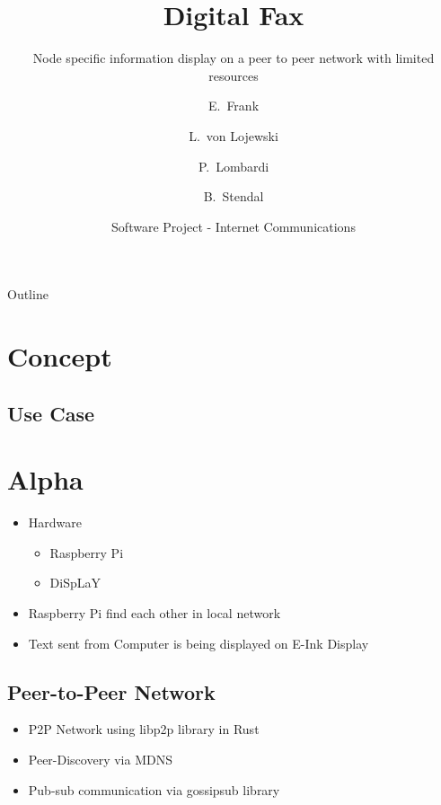 \documentclass[ucs,9pt]{beamer}
\title[Digital Fax] %
{Digital Fax}
\subtitle
{Node specific information display on a peer to peer network with limited resources  }
\author[Frank, Lojewski, Lombardi, Stendal] %
{E.~Frank \and L.~von Lojewski \and P.~Lombardi \and B.~Stendal}
\institute[FU Berlin]
{Freie Universität Berlin}
\date[SWP Internet Communication] 
{Software Project - Internet Communications}
\begin{document}
\begin{frame}[plain]
  \titlepage
\end{frame}

\begin{frame}{Outline}
  \tableofcontents
\end{frame}

\section{Concept}
\begin{frame}{\insertsection}

\end{frame}
\subsection{Use Case}
\begin{frame}{\insertsubsection}
\end{frame}

\section{Alpha}
\begin{frame}{\insertsection}
\begin{itemize}
    \item Hardware
    \begin{itemize}
        \item Raspberry Pi 
        \item DiSpLaY
    \end{itemize}
    \item Raspberry Pi find each other in local network
    \item Text sent from Computer is being displayed on E-Ink Display
    
\end{itemize}
\end{frame}

\subsection{Peer-to-Peer Network}
\begin{frame}{\insertsubsection}
\begin{itemize}
    \item P2P Network using libp2p library in Rust
    \item Peer-Discovery via MDNS
    \item Pub-sub communication via gossipsub library
    
\end{itemize}
\end{frame}
\end{document}
